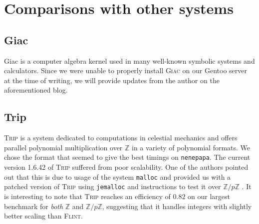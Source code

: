 \documentclass{deliverablereport}
\begin{document}
\section{Comparisons with other systems}
\subsection{Giac}
Giac \cite{Giac} is a computer algebra kernel used in many well-known symbolic systems and calculators. Since we were unable to properly install \textsc{Giac} on our Gentoo server at the time of writing, we will provide updates from the author on the aforementioned blog.

\subsection{Trip}
\textsc{Trip} \cite{Gastineau:2011:TCA:1940475.1940518} is a system dedicated to computations in celestial mechanics and offers parallel polynomial multiplication over $\mathbb{Z}$ in a variety of polynomial formats. We chose the format that seemed to give the best timings on {\tt nenepapa}. The current version 1.6.42 of \textsc{Trip} suffered from poor scalability. One of the authors pointed out that this is due to usage of the system {\tt malloc} and provided us with a patched version of \textsc{Trip} using {\tt jemalloc} and instructions to test it over $\mathbb{Z}/p\mathbb{Z}$ . It is interesting to note that \textsc{Trip} reaches an efficiency of $0.82$ on our largest benchmark for \emph{both} $\mathbb{Z}$ and $\mathbb{Z}/p\mathbb{Z}$, suggesting that it handles integers with slightly better scaling than \textsc{Flint}.
\end{document}
